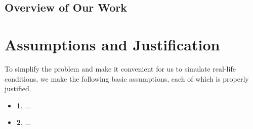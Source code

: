 \documentclass{mcmthesis}
\begin{document}
	
	
	
	
	
	
	
	
	\subsection{Overview of Our Work}
	
	
	
	
	
	
	
	
	
	\section{Assumptions and Justification}
	
	To simplify the problem and make it convenient for us to simulate real-life 
	conditions, we make the following basic assumptions, each of which is properly 
	justified.
	
	\begin{itemize}
		\item {\bf 1}. ...
		\item {\bf 2}. ...	
	\end{itemize}
	
	
	
	
	
	
	
	
	
	
\end{document}
